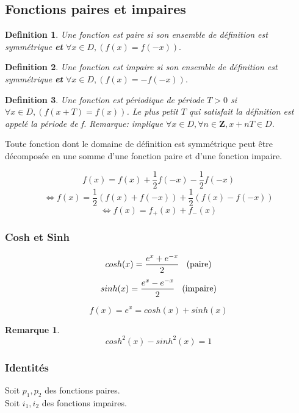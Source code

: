 \documentclass{article}
\newtheorem{definition}{Definition}[section]
\newtheorem{remark}{Remarque}[section]
\begin{document}
\subsection{Fonctions paires et impaires}
\begin{definition}
    Une fonction est paire si son ensemble de définition est symmétrique \textbf{et} $ \forall x \in D, (f(x) = f(-x)).$
\end{definition}
\begin{definition}
    Une fonction est impaire si son ensemble de définition est symmétrique \textbf{et} $ \forall x \in D, (f(x) = -f(-x)).$
\end{definition}

\begin{definition}
    Une fonction est périodique de période $ T > 0 $ si $ \forall x \in D, (f(x+T) = f(x)) $. Le plus petit $ T $ qui satisfait la définition est appelé la période de f. Remarque: implique $ \forall x \in D, \forall n \in \mathbf{Z}, x + nT \in D$. 
\end{definition}

Toute fonction dont le domaine de définition est symmétrique peut être décomposée en une somme d'une fonction paire et d'une fonction impaire.

\[ f(x) = f(x) + \frac{1}{2} f(-x) - \frac{1}{2} f(-x) \]
\[ \Leftrightarrow f(x) = \frac{1}{2}(f(x) + f(-x)) + \frac{1}{2}(f(x) - f(-x)) \]
\[ \Leftrightarrow f(x) = f_{+}(x) + f_{-}(x) \]

\subsubsection{Cosh et Sinh}

\[ cosh(x) = \frac{e^x + e^{-x}}{2} \hspace{0.3cm} \text{(paire)} \]
\[ sinh(x) = \frac{e^x - e^{-x}}{2} \hspace{0.3cm} \text{(impaire)}\]

\[ f(x) = e^x = cosh(x) + sinh(x) \]
\begin{remark}
    \[ cosh^2(x) - sinh^2(x) = 1 \]
\end{remark}

\subsubsection{Identités}

Soit $ p_1, p_2 $ des fonctions paires.\\
Soit $ i_1, i_2 $ des fonctions impaires.
\end{document}
